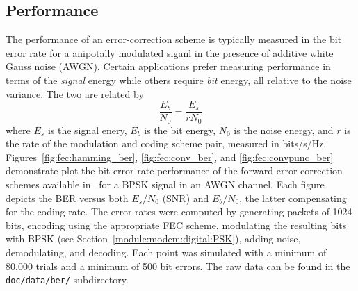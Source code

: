 \subsection{Performance}
\label{module:fec:performance}
The performance of an error-correction scheme is typically measured in
the bit error rate for a anipotally modulated siganl in the presence of
additive white Gauss noise (AWGN).
Certain applications prefer measuring performance in terms of the
{\em signal} energy while others require {\em bit} energy,
all relative to the noise variance.
The two are related by
%
\begin{equation}
\label{eqn:fec:esn0_ebn0}
    \frac{E_b}{N_0} = \frac{E_s}{r N_0}
\end{equation}
%
where
$E_s$ is the signal enery,
$E_b$ is the bit energy,
$N_0$ is the noise energy,
and
$r$ is the rate of the modulation and coding scheme pair,
measured in bits/s/Hz.
Figures~\ref{fig:fec:hamming_ber}, \ref{fig:fec:conv_ber}, and
\ref{fig:fec:convpunc_ber}
demonstrate plot the bit error-rate performance of the forward
error-correction schemes available in \liquid\ for a BPSK signal
in an AWGN channel.
Each figure depicts the BER versus both $E_s/N_0$ (SNR) and $E_b/N_0$,
the latter compensating for the coding rate.
The error rates were computed by generating packets of 1024 bits,
encoding using the appropriate FEC scheme,
modulating the resulting bits with BPSK
(see Section~\ref{module:modem:digital:PSK}),
adding noise, demodulating, and decoding.
Each point was simulated with a minimum of 80,000 trials and a minimum
of 500 bit errors.
The raw data can be found in the {\tt doc/data/ber/} subdirectory.

